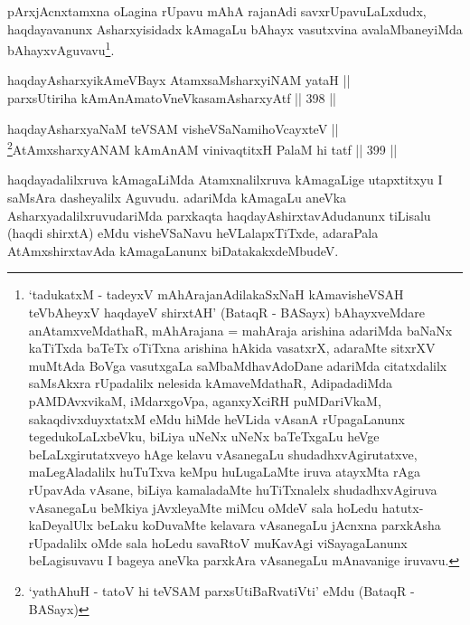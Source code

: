 \begin{artha}
pArxjAcnxtamxna oLagina rUpavu mAhA rajanAdi savxrUpavuLaLxdudx,
haqdayavanunx Asharxyisidadx kAmagaLu bAhayx vasutxvina
avalaMbaneyiMda bAhayxvAguvavu\footnote{`tadukatxM - tadeyxV mAhArajanAdilakaSxNaH kAmavisheVSAH teVbAheyxV haqdayeV shirxtAH' (BataqR - BASayx) bAhayxveMdare anAtamxveMdathaR, mAhArajana = mahAraja arishina adariMda baNaNx kaTiTxda baTeTx oTiTxna arishina hAkida vasatxrX, adaraMte sitxrXV muMtAda BoVga vasutxgaLa saMbaMdhavAdoDane adariMda citatxdalilx saMsAkxra rUpadalilx nelesida kAmaveMdathaR, AdipadadiMda pAMDAvxvikaM, iMdarxgoVpa, aganxyXciRH puMDariVkaM, sakaqdivxduyxtatxM eMdu hiMde heVLida vAsanA rUpagaLanunx tegedukoLaLxbeVku, biLiya uNeNx uNeNx baTeTxgaLu heVge beLaLxgirutatxveyo hAge kelavu vAsanegaLu shudadhxvAgirutatxve, maLegAladalilx huTuTxva keMpu huLugaLaMte iruva atayxMta rAga rUpavAda vAsane, biLiya kamaladaMte huTiTxnalelx shudadhxvAgiruva vAsanegaLu beMkiya jAvxleyaMte miMcu oMdeV sala hoLedu hatutx-kaDeyalUlx beLaku koDuvaMte kelavara vAsanegaLu jAcnxna parxkAsha rUpadalilx oMde sala hoLedu savaRtoV muKavAgi viSayagaLanunx beLagisuvavu I bageya aneVka parxkAra vAsanegaLu mAnavanige iruvavu.}.
\end{artha}


\begin{shl}
haqdayAsharxyikAmeVBayx AtamxsaMsharxyiNAM yataH || \\
parxsUtiriha kAmAnAmatoV\s neVkasamAsharxyAtf \hfill || 398 ||  
\end{shl}

\begin{shl}
haqdayAsharxyaNaM teVSAM visheVSaNamihoVcayxteV || \\
\footnote{`yathA\s \s huH - tatoV hi teVSAM parxsUtiBaRvatiVti' eMdu (BataqR - BASayx)}AtAmxsharxyANAM kAmAnAM vinivaqtitxH PalaM hi tatf \hfill || 399 ||  
\end{shl}


\begin{artha} 
haqdayadalilxruva kAmagaLiMda Atamxnalilxruva kAmagaLige\break
utapxtitxyu I saMsAra dasheyalilx Aguvudu. adariMda kAmagaLu aneVka
AsharxyadalilxruvudariMda parxkaqta haqdayAshirxtavAdudanunx tiLisalu
(haqdi shirxtA) eMdu visheVSaNavu heVLalapxTiTxde, adaraPala
AtAmxshirxtavAda kAmagaLanunx biDatakakxdeMbudeV.
\end{artha}

